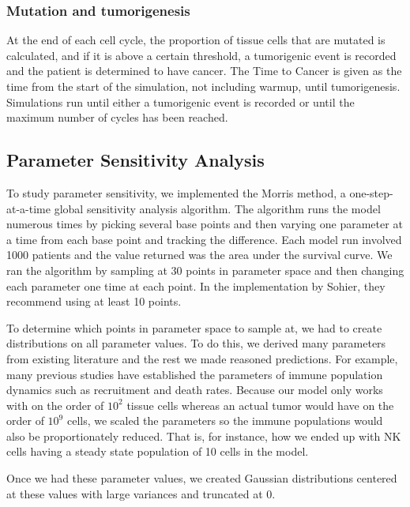 \documentclass[11pt]{article}
\newcommand{\tcr} { \textcolor{red} }
\begin{document}
\subsubsection{Mutation and tumorigenesis}
At the end of each cell cycle, the proportion of tissue cells that are mutated is calculated, and if it is above a certain threshold, a tumorigenic event is recorded and the patient is determined to have cancer.
The Time to Cancer is given as the time from the start of the simulation, not including warmup, until tumorigenesis.
Simulations run until either a tumorigenic event is recorded or until the maximum number of cycles has been reached.

\subsection{Parameter Sensitivity Analysis}
To study parameter sensitivity, we implemented the Morris method, a one-step-at-a-time global sensitivity analysis algorithm.
The algorithm runs the model numerous times by picking several base points and then varying one parameter at a time from each base point and tracking the difference\cite{morris1991factorial, sohier2014improvement}.
Each model run involved 1000 patients and the value returned was the area under the survival curve.
We ran the algorithm by sampling at 30 points in parameter space and then changing each parameter one time at each point.
In the implementation by Sohier, they recommend using at least 10 points\cite{sohier2014improvement}.
\par
To determine which points in parameter space to sample at, we had to create distributions on all parameter values.
To do this, we derived many parameters from existing literature and the rest we made reasoned predictions.
For example, many previous studies have established the parameters of immune population dynamics such as recruitment and death rates\cite{de2014modeling}.
Because our model only works with on the order of $10^2$ tissue cells whereas an actual tumor would have on the order of $10^9$ cells\cite{de2014modeling}, we scaled the parameters so the immune populations would also be proportionately reduced.
That is, for instance, how we ended up with NK cells having a steady state population of 10 cells in the model.
\par
Once we had these parameter values, we created Gaussian distributions centered at these values with large variances and truncated at 0.
\end{document}
